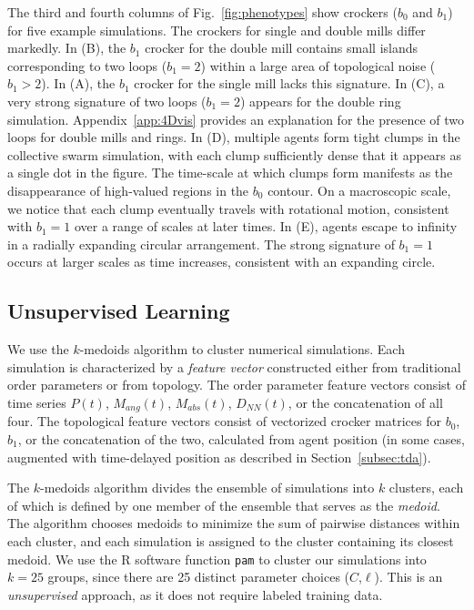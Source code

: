 \documentclass[%
 aip,
reprint,
 amsmath,amssymb,
 aps,
showkeys
]{revtex4-1}
\begin{document}
The third and fourth columns of Fig.~\ref{fig:phenotypes} show crockers ($b_0$ and $b_1$) for five example simulations. The crockers for single and double mills differ markedly. In (B), the $b_1$ crocker for the double mill contains small islands corresponding to two loops ($b_1=2$) within a large area of topological noise ($b_1>2$). In (A), the $b_1$ crocker for the single mill lacks this signature. In (C), a very strong signature of two loops ($b_1=2$) appears for the double ring simulation. Appendix~\ref{app:4Dvis} provides an explanation for the presence of two loops for double mills and rings. In (D), multiple agents form tight clumps in the collective swarm simulation, with each clump sufficiently dense that it appears as a single dot in the figure. The time-scale at which clumps form manifests as the disappearance of high-valued regions in the $b_0$ contour. On a macroscopic scale, we notice that each clump eventually travels with rotational motion, consistent with $b_1=1$ over a range of scales at later times. In (E), agents escape to infinity in a radially expanding circular arrangement. The strong signature of $b_1=1$ occurs at larger scales as time increases, consistent with an expanding circle.

\subsection{Unsupervised Learning}
\label{sec:unsupervised}

We use the $k$-medoids algorithm to cluster numerical simulations. Each simulation is characterized by a \emph{feature vector} constructed either from traditional order parameters or from topology. The order parameter feature vectors consist of time series $P(t)$, $M_{ang}(t)$, $M_{abs}(t)$, $D_{NN}(t)$, or the concatenation of all four. The topological feature vectors consist of vectorized crocker matrices for $b_0$, $b_1$, or the concatenation of the two, calculated from agent position (in some cases, augmented with time-delayed position as described in Section~\ref{subsec:tda}).

The $k$-medoids algorithm divides the ensemble of simulations into $k$ clusters, each of which is defined by one member of the ensemble that serves as the \emph{medoid}. The algorithm chooses medoids to minimize the sum of pairwise distances within each cluster, and each simulation is assigned to the cluster containing its closest medoid. We use the R software function \texttt{pam} to cluster our simulations into $k=25$ groups, since there are 25 distinct parameter choices ($C$,$\ell$). This is an \emph{unsupervised} approach, as it does not require labeled training data.
\end{document}
